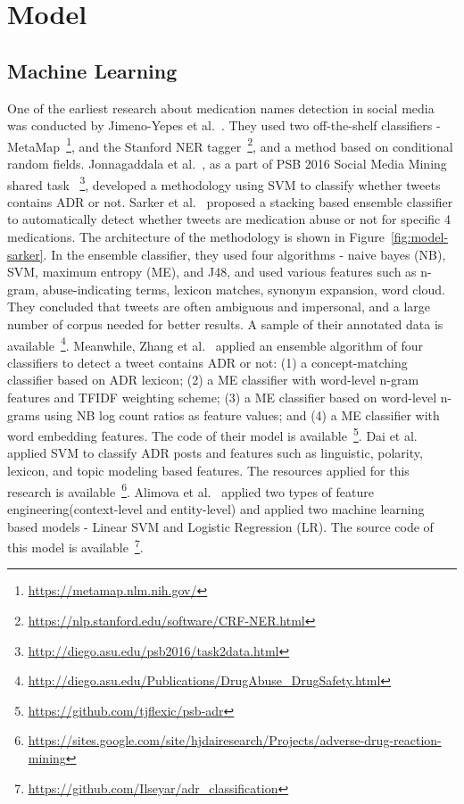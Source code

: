 \section{Model}


\subsection{Machine Learning}

One of the earliest research about medication names detection in social media was conducted by Jimeno-Yepes et al.~\cite{jimeno2015identifying}. They used two off-the-shelf classifiers - MetaMap~\footnote{\url{https://metamap.nlm.nih.gov/}}, and the Stanford NER tagger~\footnote{\url{https://nlp.stanford.edu/software/CRF-NER.html}}, and a method based on conditional random fields. Jonnagaddala et al.~\cite{jonnagaddala2016binary}, as a part of PSB 2016 Social Media Mining shared task ~\footnote{\url{http://diego.asu.edu/psb2016/task2data.html}}, developed a methodology using SVM to classify whether tweets contains ADR or not. Sarker et al.~\cite{sarker2016social} proposed a stacking based ensemble classifier to automatically detect whether tweets are medication abuse or not for specific 4 medications. The architecture of the methodology is shown in Figure~\ref{fig:model-sarker}. In the ensemble classifier, they used four algorithms - naive bayes (NB), SVM, maximum entropy (ME), and J48, and used various features such as n-gram, abuse-indicating terms, lexicon matches, synonym expansion, word cloud. They concluded that tweets are often ambiguous and impersonal, and a large number of corpus needed for better results. A sample of their annotated data is available~\footnote{\url{http://diego.asu.edu/Publications/DrugAbuse_DrugSafety.html}}. Meanwhile, Zhang et al.~\cite{zhang2016ensemble} applied an ensemble algorithm of four classifiers to detect a tweet contains ADR or not: (1) a concept-matching classifier based on ADR lexicon; (2) a ME classifier with word-level n-gram features and TFIDF weighting scheme; (3) a ME classifier based on word-level n-grams using NB log count ratios as feature values; and (4) a ME classifier with word embedding features. The code of their model is available~\footnote{\url{https://github.com/tjflexic/psb-adr}}. Dai et al.~\cite{dai2016feature} applied SVM to classify ADR posts and features such as linguistic, polarity, lexicon, and topic modeling based features. The resources applied for this research is available~\footnote{\url{https://sites.google.com/site/hjdairesearch/Projects/adverse-drug-reaction-mining}}. Alimova et al.~\cite{alimova2017automated} applied two types of feature engineering(context-level and entity-level) and applied two machine learning based models - Linear SVM and Logistic Regression (LR). The source code of this model is available~\footnote{\url{https://github.com/Ilseyar/adr_classification}}.

